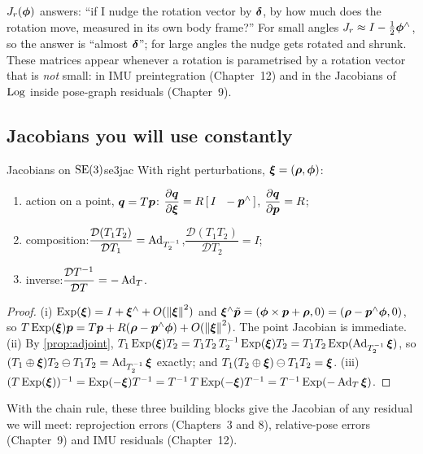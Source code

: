 \begin{inwords}
$J_r(\bm{\phi})$ answers: ``if I nudge the rotation vector by
$\bm{\delta}$, by how much does the rotation move, measured in its own
body frame?'' For small angles $J_r\approx I-\tfrac12\bm{\phi}^{\wedge}$, so
the answer is ``almost $\bm{\delta}$''; for large angles the nudge gets
rotated and shrunk. These matrices appear whenever a rotation is
parametrised by a rotation vector that is \emph{not} small: in IMU
preintegration (Chapter~12) and in the Jacobians of $\operatorname{Log}$ inside
pose-graph residuals (Chapter~9).
\end{inwords}

\subsection{Jacobians you will use constantly}

\begin{proposition}{Jacobians on $\mathrm{SE}(3)$}{se3jac}
With right perturbations, $\bm{\xi}=(\bm{\rho},\bm{\phi})$:
\begin{enumerate}[label=(\roman*),nosep]
\item action on a point, $\bm{q}=T\bm{p}$:\quad
  $\dfrac{\partial\vect{q}}{\partial\bxi}=R\,[\,I\ \ -\hatop{\p}\,]$,
  \quad $\dfrac{\partial\bm{q}}{\partial\bm{p}}=R$;
\item composition:\quad $\dfrac{\mathcal{D}(T_1T_2)}{\mathcal{D}T_1}=
  \operatorname{Ad}_{T_2^{-1}}$,\quad $\dfrac{\mathcal{D}(T_1T_2)}{\mathcal{D}T_2}=I$;
\item inverse:\quad $\dfrac{\mathcal{D}T^{-1}}{\mathcal{D}T}=-\operatorname{Ad}_T$.
\end{enumerate}
\end{proposition}

\begin{proof}
(i) $\operatorname{Exp}(\bm{\xi})=I+\bm{\xi}^{\wedge}+O(\left\lVert \bm{\xi}\right\rVert^2)$ and
$\bm{\xi}^{\wedge}\tilde{\bm{p}}=(\bm{\phi}\times\bm{p}+\bm{\rho},0)=(\bm{\rho}-\bm{p}^{\wedge}\bm{\phi},0)$,
so $T\operatorname{Exp}(\bm{\xi})\bm{p}=T\bm{p}+R(\bm{\rho}-\bm{p}^{\wedge}\bm{\phi})+O(\left\lVert \bm{\xi}\right\rVert^2)$. The
point Jacobian is immediate. (ii) By \cref{prop:adjoint},
$T_1\operatorname{Exp}(\bm{\xi})T_2=T_1T_2\,T_2^{-1}\operatorname{Exp}(\bm{\xi})T_2=T_1T_2\operatorname{Exp}(\operatorname{Ad}_{T_2^{-1}}
\bm{\xi})$, so $(T_1\oplus\bm{\xi})T_2\ominus T_1T_2=\operatorname{Ad}_{T_2^{-1}}\bm{\xi}$ exactly;
and $T_1(T_2\oplus\bm{\xi})\ominus T_1T_2=\bm{\xi}$. (iii)
$(T\operatorname{Exp}(\bm{\xi}))^{-1}=\operatorname{Exp}(-\bm{\xi})T^{-1}=T^{-1}\,T\operatorname{Exp}(-\bm{\xi})T^{-1}=
T^{-1}\operatorname{Exp}(-\operatorname{Ad}_T\bm{\xi})$.
\end{proof}

With the chain rule, these three building blocks give the Jacobian of
any residual we will meet: reprojection errors (Chapters~3 and 8),
relative-pose errors (Chapter~9) and IMU residuals (Chapter~12).

